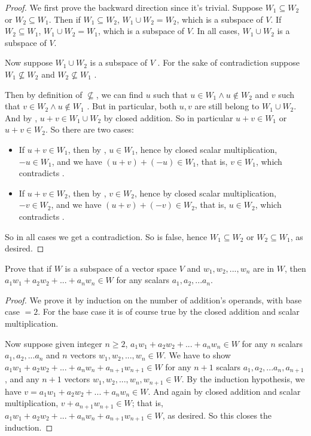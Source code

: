 \begin{proof}
We first prove the backward direction since it's trivial.
Suppose \(W_1 \subseteq W_2\) or \(W_2 \subseteq W_1\).
Then if \(W_1 \subseteq W_2\), \(W_1 \cup W_2 = W_2\), which is a subspace of \(V\).
If \(W_2 \subseteq W_1\), \(W_1 \cup W_2 = W_1\), which is a subspace of \(V\).
In all cases, \(W_1 \cup W_2\) is a subspace of \(V\).

Now suppose \(W_1 \cup W_2\) is a subspace of \(V\) .
For the sake of contradiction suppose \(W_1 \not \subseteq W_2\) and \(W_2 \not \subseteq W_1\) .

Then by definition of \(\not \subseteq\), we can find \(u\) such that \(u \in W_1 \land u \not \in W_2\)  and \(v\) such that \(v \in W_2 \land u \not \in W_1\) .
But in particular, both \(u, v\) are still belong to \(W_1 \cup W_2\).
And by , \(u + v \in W_1 \cup W_2\) by closed addition.
So in particular \(u + v \in W_1\) or \(u + v \in W_2\).
So there are two cases:
\begin{itemize}
    \item If \(u + v \in W_1\), then by , \(u \in W_1\), hence by closed scalar multiplication, \(-u \in W_1\), and we have \((u + v) + (-u) \in W_1\), that is, \(v \in W_1\), which contradicts .
    \item If \(u + v \in W_2\), then by , \(v \in W_2\), hence by closed scalar multiplication, \(-v \in W_2\), and we have \((u + v) + (-v) \in W_2\), that is, \(u \in W_2\), which contradicts .
\end{itemize}
So in all cases we get a contradiction.
So  is false, hence \(W_1 \subseteq W_2\) or \(W_2 \subseteq W_1\), as desired.
\end{proof}

\begin{exercise} \label{exercise 1.3.20}
Prove that if \(W\) is a subspace of a vector space \(V\) and \(w_1, w_2, ..., w_n\) are in \(W\), then \(a_1 w_1 + a_2 w_2 + ... + a_n w_n \in W\) for any scalars \(a_1, a_2, ... a_n\).
\end{exercise}

\begin{proof}
We prove it by induction on the number of addition's operands, with base case \(= 2\).
For the base case it is of course true by the closed addition and scalar multiplication.

Now suppose given integer \(n \ge 2\), \(a_1 w_1 + a_2 w_2 + ... + a_n w_n \in W\) for any \(n\) scalars \(a_1, a_2, ... a_n\) and \(n\) vectors \(w_1, w_2, ..., w_n \in W\).
We have to show \(a_1 w_1 + a_2 w_2 + ... + a_n w_n + a_{n + 1} w_{n + 1} \in W\) for any \(n + 1\) scalars \(a_1, a_2, ... a_n, a_{n + 1}\),
and any \(n + 1\) vectors \(w_1, w_2, ..., w_n, w_{n + 1} \in W\).
By the induction hypothesis, we have \(v = a_1 w_1 + a_2 w_2 + ... + a_n w_n \in W\).
And again by closed addition and scalar multiplication, \(v + a_{n + 1} w_{n + 1} \in W\);
that is, \(a_1 w_1 + a_2 w_2 + ... + a_n w_n + a_{n + 1} w_{n + 1} \in W\), as desired.
So this closes the induction.
\end{proof}


